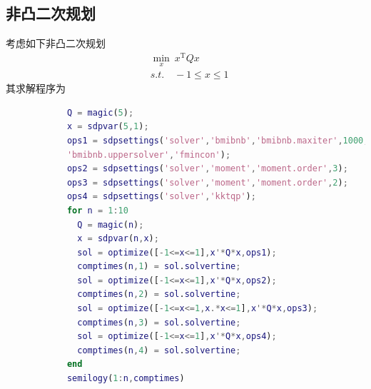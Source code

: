         \subsection{非凸二次规划}
            \par
            考虑如下非凸二次规划
            \begin{align*}
            & \min_x\ x^\mathrm{T}Qx \\
            & s.t.\quad -1 \leqslant x \leqslant 1
            \end{align*}
            其求解程序为
            \begin{lstlisting}[language = Matlab]
            %% 非凸二次规划
            Q = magic(5);
            x = sdpvar(5,1);
            ops1 = sdpsettings('solver','bmibnb','bmibnb.maxiter',1000,...
            'bmibnb.uppersolver','fmincon');
            ops2 = sdpsettings('solver','moment','moment.order',3);
            ops3 = sdpsettings('solver','moment','moment.order',2);
            ops4 = sdpsettings('solver','kktqp');
            for n = 1:10
              Q = magic(n);
              x = sdpvar(n,x);
              sol = optimize([-1<=x<=1],x'*Q*x,ops1);
              comptimes(n,1) = sol.solvertine;
              sol = optimize([-1<=x<=1],x'*Q*x,ops2);
              comptimes(n,2) = sol.solvertine;
              sol = optimize([-1<=x<=1,x.*x<=1],x'*Q*x,ops3);
              comptimes(n,3) = sol.solvertine;
              sol = optimize([-1<=x<=1],x'*Q*x,ops4);
              comptimes(n,4) = sol.solvertine;
            end
            semilogy(1:n,comptimes)
            \end{lstlisting}
% 
